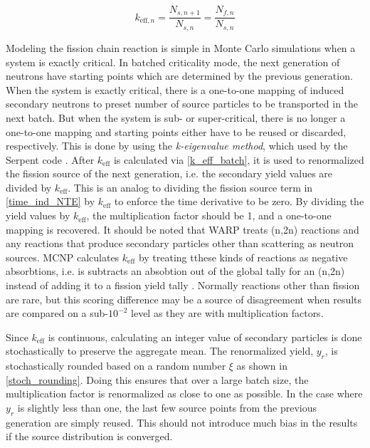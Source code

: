 \begin{equation}
\label{k_eff_batch}
k_{\mathrm{eff},n} = \frac{N_{s,n+1}}{N_{s,n}} = \frac{N_{f,n}}{N_{s,n}}
\end{equation}

Modeling the fission chain reaction is simple in Monte Carlo simulations when a system is exactly critical.  In batched criticality mode, the next generation of neutrons have starting points which are determined by the previous generation.  When the system is exactly critical, there is a one-to-one mapping of induced secondary neutrons to preset number of source particles to be transported in the next batch.  But when the system is sub- or super-critical, there is no longer a one-to-one mapping and starting points either have to be reused or discarded, respectively.  This is done by using the \emph{k-eigenvalue method}, which used by the Serpent code \cite{jaakko}.  After $k_\mathrm{eff}$ is calculated via \eqref{k_eff_batch}, it is used to renormalized the fission source of the next generation, i.e. the secondary yield values are divided by $k_\mathrm{eff}$.  This is an analog to dividing the fission source term in \eqref{time_ind_NTE} by $k_\mathrm{eff}$ to enforce the time derivative to be zero.  By dividing the yield values by $k_\mathrm{eff}$, the multiplication factor should be 1, and a one-to-one mapping is recovered.  It should be noted that WARP treats (n,2n) reactions and any reactions that produce secondary particles other than scattering as neutron sources.  MCNP calculates $k_\mathrm{eff}$ by treating tthese kinds of reactions as negative absorbtions, i.e. is subtracts an absobtion out of the global tally for an (n,2n) instead of adding it to a fission yield tally \cite{mcnp}.  Normally reactions other than fission are rare, but this scoring difference may be a source of disagreement when results are compared on a sub-$10^{-2}$ level as they are with multiplication factors.

Since $k_\mathrm{eff}$ is continuous, calculating an integer value of secondary particles is done stochastically to preserve the aggregate mean.  The renormalized yield, $y_r$, is stochastically rounded based on a random number $\xi$ as shown in  \eqref{stoch_rounding}.  Doing this ensures that over a large batch size, the multiplication factor is renormalized as close to one as possible.  In the case where $y_r$ is slightly less than one, the last few source points from the previous generation are simply reused.  This should not introduce much bias in the results if the source distribution is converged.

